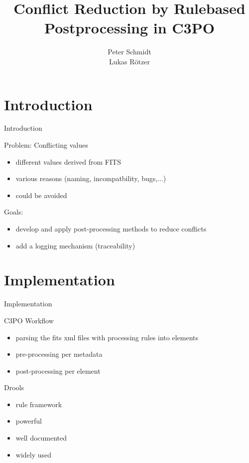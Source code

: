 \documentclass{beamer}
\title{Conflict Reduction by Rulebased Postprocessing in C3PO
}
\author[P. Schmidt]{
	Peter Schmidt\\ 
	Lukas Rötzer
}
\begin{document}
\frame{
  \titlepage
}

\section{Introduction}

\begin{frame}{Introduction}

   Problem: Conflicting values
    \begin{itemize}
      \item different values derived from FITS
      \item various reasons (naming, incompatbility, bugs,...)
      \item could be avoided
    \end{itemize}

    \vspace{5pt}
    Goals:
    \begin{itemize}
      \item develop and apply post-processing methods to reduce conflicts
      \item add a logging mechanism (traceability)
    \end{itemize} 
\note{

}
\end{frame}

\section{Implementation}

\begin{frame}{Implementation}

  C3PO Workflow
      \begin{itemize}
        \item parsing the fits xml files with processing rules into elements
        \item pre-processing per metadata
        \item post-processing per element
      \end{itemize}
   
    \vspace{5pt}
    Drools
        \begin{itemize}
          \item rule framework
          \item powerful
          \item well documented
          \item widely used
        \end{itemize}
\note{

}
\end{frame}
\end{document}
